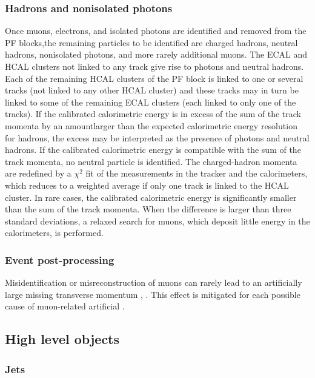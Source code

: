 \subsubsection{Hadrons and nonisolated photons} 
Once muons, electrons, and isolated photons are identified and removed from the PF blocks,the remaining particles to be identified are charged hadrons, neutral hadrons, nonisolated photons, and more rarely additional muons. The ECAL and HCAL clusters not linked to any track give rise to photons and neutral hadrons. Each of the remaining HCAL clusters of the PF block is linked to one or several tracks (not linked to any other HCAL cluster) and these tracks may in turn be linked to some of the remaining ECAL clusters (each linked to only one of the tracks). If the calibrated calorimetric energy is in excess of the sum of the track momenta by an amountlarger than the expected calorimetric energy resolution for hadrons, the excess may be interpreted as the presence of photons and neutral hadrons. If the calibrated calorimetric energy is compatible with the sum of the track momenta, no neutral particle is identified.  The charged-hadron momenta are redefined by a $\chi^2$ fit of the measurements in the tracker and the calorimeters,  which reduces to a weighted average if only one track is linked to the HCAL cluster. In  rare  cases,  the  calibrated  calorimetric  energy  is  significantly  smaller  than  the  sum  of  the track momenta. When the difference is larger than three standard deviations, a relaxed search for muons,  which deposit little energy in the calorimeters,  is performed.

\subsubsection{Event post-processing} 
Misidentification or misreconstruction of muons can rarely lead to an artificially large missing transverse momentum , \PTm. This effect is mitigated for each possible cause of muon-related artificial \PTm \cite{CMS-PRF-14-001}.

\subsection{High level objects}

\subsubsection{Jets}
\label{sec:jet_clustering}

